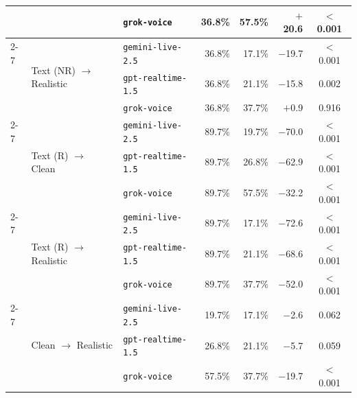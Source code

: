 \begin{tabular}{lllrrrc}
 &  & {\color{red!75!black}\texttt{grok-voice}} & 36.8\% & 57.5\% & $+$20.6 & $<$0.001 \\
\cmidrule(l){2-7}
 & \multirow{3}{*}{Text (NR) $\to$ Realistic} & {\color{red!75!black}\texttt{gemini-live-2.5}} & 36.8\% & 17.1\% & $-$19.7 & $<$0.001 \\
 &  & {\color{red!75!black}\texttt{gpt-realtime-1.5}} & 36.8\% & 21.1\% & $-$15.8 & 0.002 \\
 &  & {\color{red!75!black}\texttt{grok-voice}} & 36.8\% & 37.7\% & $+$0.9 & 0.916 \\
\cmidrule(l){2-7}
 & \multirow{3}{*}{Text (R) $\to$ Clean} & {\color{red!75!black}\texttt{gemini-live-2.5}} & 89.7\% & 19.7\% & $-$70.0 & $<$0.001 \\
 &  & {\color{red!75!black}\texttt{gpt-realtime-1.5}} & 89.7\% & 26.8\% & $-$62.9 & $<$0.001 \\
 &  & {\color{red!75!black}\texttt{grok-voice}} & 89.7\% & 57.5\% & $-$32.2 & $<$0.001 \\
\cmidrule(l){2-7}
 & \multirow{3}{*}{Text (R) $\to$ Realistic} & {\color{red!75!black}\texttt{gemini-live-2.5}} & 89.7\% & 17.1\% & $-$72.6 & $<$0.001 \\
 &  & {\color{red!75!black}\texttt{gpt-realtime-1.5}} & 89.7\% & 21.1\% & $-$68.6 & $<$0.001 \\
 &  & {\color{red!75!black}\texttt{grok-voice}} & 89.7\% & 37.7\% & $-$52.0 & $<$0.001 \\
\cmidrule(l){2-7}
 & \multirow{3}{*}{Clean $\to$ Realistic} & {\color{red!75!black}\texttt{gemini-live-2.5}} & 19.7\% & 17.1\% & $-$2.6 & 0.062 \\
 &  & {\color{red!75!black}\texttt{gpt-realtime-1.5}} & 26.8\% & 21.1\% & $-$5.7 & 0.059 \\
 &  & {\color{red!75!black}\texttt{grok-voice}} & 57.5\% & 37.7\% & $-$19.7 & $<$0.001 \\
\bottomrule
\end{tabular}
